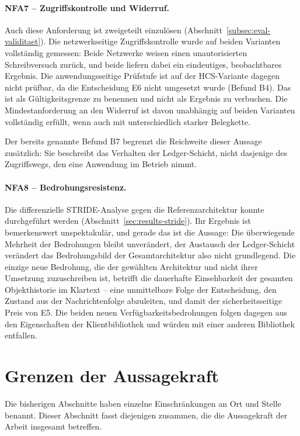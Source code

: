 \paragraph{NFA7 -- Zugriffskontrolle und Widerruf.} Auch diese Anforderung ist zweigeteilt einzulösen (Abschnitt~\ref{subsec:eval-validitaet}). Die netzwerkseitige Zugriffskontrolle wurde auf beiden Varianten vollständig gemessen: Beide Netzwerke weisen einen unautorisierten Schreibversuch zurück, und beide liefern dabei ein eindeutiges, beobachtbares Ergebnis. Die anwendungsseitige Prüfstufe ist auf der HCS-Variante dagegen nicht prüfbar, da die Entscheidung E6 nicht umgesetzt wurde (Befund B4). Das ist als Gültigkeitsgrenze zu benennen und nicht als Ergebnis zu verbuchen. Die Mindestanforderung an den Widerruf ist davon unabhängig auf beiden Varianten vollständig erfüllt, wenn auch mit unterschiedlich starker Belegkette.

Der bereits genannte Befund B7 begrenzt die Reichweite dieser Aussage zusätzlich: Sie beschreibt das Verhalten der Ledger-Schicht, nicht dasjenige des Zugriffswegs, den eine Anwendung im Betrieb nimmt.

\paragraph{NFA8 -- Bedrohungsresistenz.} Die differenzielle STRIDE-Analyse gegen die Referenzarchitektur konnte durchgeführt werden (Abschnitt~\ref{sec:results-stride}). Ihr Ergebnis ist bemerkenswert unspektakulär, und gerade das ist die Aussage: Die überwiegende Mehrheit der Bedrohungen bleibt unverändert, der Austausch der Ledger-Schicht verändert das Bedrohungsbild der Gesamtarchitektur also nicht grundlegend. Die einzige neue Bedrohung, die der gewählten Architektur und nicht ihrer Umsetzung zuzuschreiben ist, betrifft die dauerhafte Einsehbarkeit der gesamten Objekthistorie im Klartext -- eine unmittelbare Folge der Entscheidung, den Zustand aus der Nachrichtenfolge abzuleiten, und damit der sicherheitsseitige Preis von E5. Die beiden neuen Verfügbarkeitsbedrohungen folgen dagegen aus den Eigenschaften der Klientbibliothek und würden mit einer anderen Bibliothek entfallen.

\section{Grenzen der Aussagekraft}
\label{sec:discussion-grenzen}

Die bisherigen Abschnitte haben einzelne Einschränkungen an Ort und Stelle benannt. Dieser Abschnitt fasst diejenigen zusammen, die die Aussagekraft der Arbeit insgesamt betreffen.

